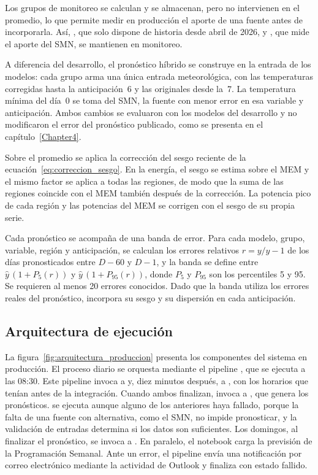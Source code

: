 Los grupos de monitoreo se calculan y se almacenan, pero no intervienen en el promedio, lo que permite medir en producción el aporte de una fuente antes de incorporarla. Así, , que solo dispone de historia desde abril de 2026, y , que mide el aporte del SMN, se mantienen en monitoreo.

A diferencia del desarrollo, el pronóstico híbrido se construye en la entrada de los modelos: cada grupo arma una única entrada meteorológica, con las temperaturas corregidas hasta la anticipación~6 y las originales desde la~7. La temperatura mínima del día~0 se toma del SMN, la fuente con menor error en esa variable y anticipación. Ambos cambios se evaluaron con los modelos del desarrollo y no modificaron el error del pronóstico publicado, como se presenta en el capítulo~\ref{Chapter4}.

Sobre el promedio se aplica la corrección del sesgo reciente de la ecuación~\ref{eq:correccion_sesgo}. En la energía, el sesgo se estima sobre el MEM y el mismo factor se aplica a todas las regiones, de modo que la suma de las regiones coincide con el MEM también después de la corrección. La potencia pico de cada región y las potencias del MEM se corrigen con el sesgo de su propia serie.

Cada pronóstico se acompaña de una banda de error. Para cada modelo, grupo, variable, región y anticipación, se calculan los errores relativos $r = y/\hat{y} - 1$ de los días pronosticados entre $D-60$ y $D-1$, y la banda se define entre $\hat{y}\,(1 + P_{5}(r))$ y $\hat{y}\,(1 + P_{95}(r))$, donde $P_{5}$ y $P_{95}$ son los percentiles 5 y 95. Se requieren al menos 20 errores conocidos. Dado que la banda utiliza los errores reales del pronóstico, incorpora su sesgo y su dispersión en cada anticipación.

\subsection{Arquitectura de ejecución}
\label{subsec:arquitectura_produccion}

La figura~\ref{fig:arquitectura_produccion} presenta los componentes del sistema en producción. El proceso diario se orquesta mediante el pipeline , que se ejecuta a las 08:30. Este pipeline invoca a  y, diez minutos después, a , con los horarios que tenían antes de la integración. Cuando ambos finalizan, invoca a , que genera los pronósticos.  se ejecuta aunque alguno de los anteriores haya fallado, porque la falta de una fuente con alternativa, como el SMN, no impide pronosticar, y la validación de entradas determina si los datos son suficientes. Los domingos, al finalizar el pronóstico, se invoca a . En paralelo, el notebook  carga la previsión de la Programación Semanal. Ante un error, el pipeline envía una notificación por correo electrónico mediante la actividad de Outlook y finaliza con estado fallido.

